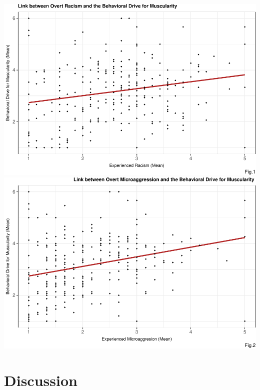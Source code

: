 \documentclass[
  english,
  man, fleqn, noextraspace,floatsintext]{apa6}
\begin{document}
\includegraphics{final_project_files/figure-latex/ggplot-1.pdf} \includegraphics{final_project_files/figure-latex/ggplot-2.pdf}

\hypertarget{discussion}{%
\section{\texorpdfstring{\textbf{Discussion}}{Discussion}}\label{discussion}}
\end{document}
